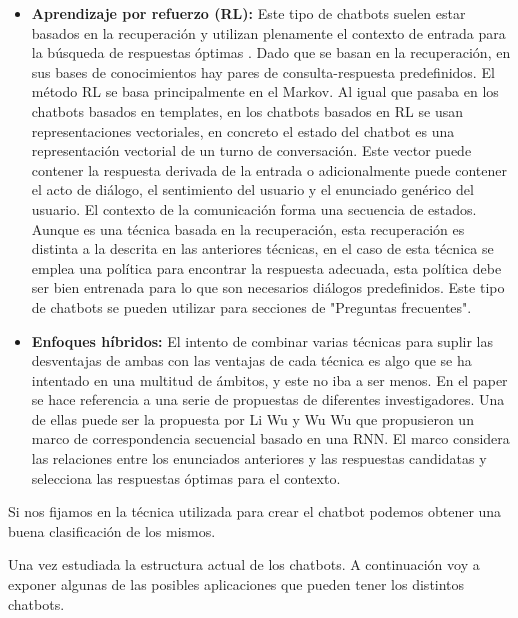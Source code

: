\begin{itemize}
\item \textbf{Aprendizaje por refuerzo (RL):} Este tipo de chatbots suelen estar basados en la recuperación y utilizan plenamente el contexto de entrada para la búsqueda de respuestas óptimas \cite{RefWorks:RefID:36-luo2022critical}. Dado que se basan en la recuperación, en sus bases de conocimientos hay pares de consulta-respuesta predefinidos. El método RL se basa principalmente en el \gls{Markov}. Al igual que pasaba en los chatbots basados en templates, en los chatbots basados en RL se usan representaciones vectoriales, en concreto el estado del chatbot es una representación vectorial de un turno de conversación. Este vector puede contener la respuesta derivada de la entrada o adicionalmente puede contener el acto de diálogo, el sentimiento del usuario y el enunciado genérico del usuario. El contexto de la comunicación forma una secuencia de estados. Aunque es una técnica basada en la recuperación, esta recuperación es distinta a la descrita en las anteriores técnicas, en el caso de esta técnica se emplea una política para encontrar la respuesta adecuada, esta política debe ser bien entrenada para lo que son necesarios diálogos predefinidos. Este tipo de chatbots se pueden utilizar para secciones de "Preguntas frecuentes".
\item \textbf{Enfoques híbridos:} \label{enfoque_hibrido} El intento de combinar varias técnicas para suplir las desventajas de ambas con las ventajas de cada técnica es algo que se ha intentado en una multitud de ámbitos, y este no iba a ser menos. En el paper \cite{RefWorks:RefID:36-luo2022critical} se hace referencia a una serie de propuestas de diferentes investigadores. Una de ellas puede ser la propuesta por Li Wu y Wu Wu que propusieron un marco de correspondencia secuencial basado en una RNN. El marco considera las relaciones entre los enunciados anteriores y las respuestas candidatas y selecciona las respuestas óptimas para el contexto.
\end{itemize}

Si nos fijamos en la técnica utilizada para crear el chatbot podemos obtener una buena clasificación de los mismos.

Una vez estudiada la estructura actual de los chatbots. A continuación voy a exponer algunas de las posibles aplicaciones que pueden tener los distintos chatbots.

